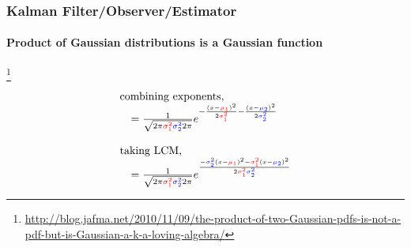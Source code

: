 \begin{frame}
\frametitle{Kalman Filter/Observer/Estimator}
\framesubtitle{Product of Gaussian distributions is a Gaussian function}

\footnote{\tiny\hspace{-0.23in} \hspace{-0.25in}
\href{http://blog.jafma.net/2010/11/09/the-product-of-two-Gaussian-pdfs-is-not-a-pdf-but-is-Gaussian-a-k-a-loving-algebra/}{http://blog.jafma.net/2010/11/09/the-product-of-two-Gaussian-pdfs-is-not-a-pdf-but-is-Gaussian-a-k-a-loving-algebra/}}
\scriptsize
\begin{equation*}
\begin{array}{llll}



\multicolumn{2}{l}{\textrm{combining exponents,}}\\
&=\frac{1}{\sqrt{2 \pi \varone \vartwo 2 \pi }}         e^{ -\frac{(x-\muone)^2}{2 \varone} - \frac{(x-\mutwo)^2}{2 \vartwo} } \\\\

\multicolumn{2}{l}{\textrm{taking LCM,}}\\
&=    \frac{1}{\sqrt{2 \pi \varone \vartwo 2 \pi }}         e^{ \frac{ - \vartwo (x-\muone)^2 - \varone (x-\mutwo)^2 } { 2 \varone \vartwo } }\\


\end{array}
\end{equation*}
\end{frame}






